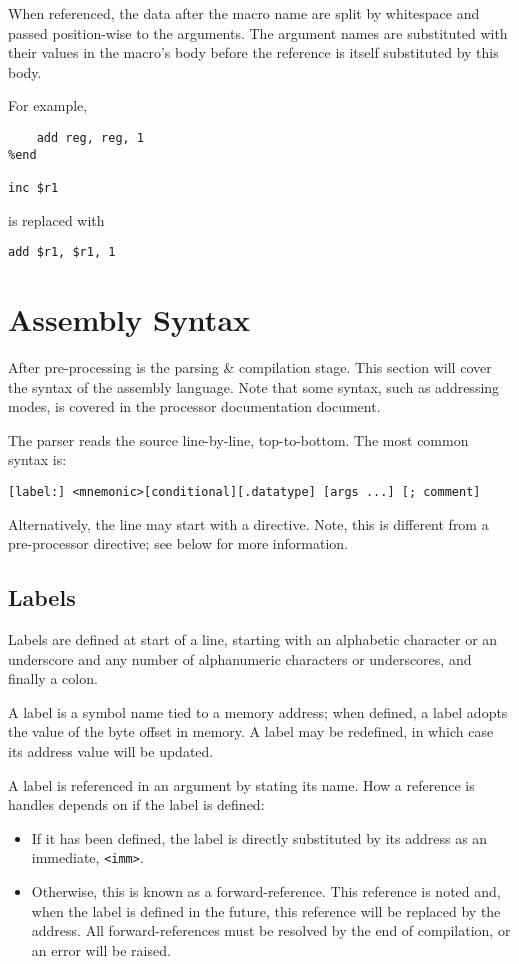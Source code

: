 \documentclass{article}
\begin{document}
When referenced, the data after the macro name are split by whitespace and passed position-wise to the arguments.
The argument names are substituted with their values in the macro's body before the reference is itself substituted by this body.

For example,

\begin{lstlisting}[style=assembly]
%macro inc reg
    add reg, reg, 1
%end

inc $r1
\end{lstlisting}

is replaced with

\begin{lstlisting}[style=assembly]
add $r1, $r1, 1
\end{lstlisting}

\section{Assembly Syntax}

After pre-processing is the parsing \& compilation stage.
This section will cover the syntax of the assembly language.
Note that some syntax, such as addressing modes, is covered in the processor documentation document.

The parser reads the source line-by-line, top-to-bottom.
The most common syntax is:

\begin{lstlisting}[style=assembly]
[label:] <mnemonic>[conditional][.datatype] [args ...] [; comment]
\end{lstlisting}

Alternatively, the line may start with a directive.
Note, this is different from a pre-processor directive; see below for more information.

\subsection{Labels}

Labels are defined at start of a line, starting with an alphabetic character or an underscore and any number of alphanumeric characters or underscores, and finally a colon.

A label is a symbol name tied to a memory address; when defined, a label adopts the value of the byte offset in memory.
A label may be redefined, in which case its address value will be updated.

A label is referenced in an argument by stating its name.
How a reference is handles depends on if the label is defined:
\begin{itemize}
    \item If it has been defined, the label is directly substituted by its address as an immediate, \texttt{<imm>}.
    \item Otherwise, this is known as a forward-reference.
    This reference is noted and, when the label is defined in the future, this reference will be replaced by the address.
    All forward-references must be resolved by the end of compilation, or an error will be raised.
\end{itemize}
\end{document}
